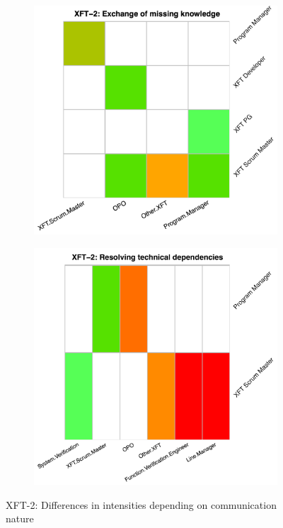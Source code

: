 \begin{figure}
\begin{subfigure}{.5\textwidth}
    \centering
    \includegraphics[width=.91\linewidth]{figures/heatmaps/picnic-_e_.pdf}
    \label{fig:hm-e-picnic}
  \end{subfigure}
  \begin{subfigure}{.5\textwidth}
    \centering
    \includegraphics[width=.91\linewidth]{figures/heatmaps/picnic-_r_.pdf}
    \label{fig:hm-r-picnic}
  \end{subfigure}
  
  \caption{XFT-2: Differences in intensities depending on communication nature}
  \label{fig:hm-overall-picnic}
\end{figure}

